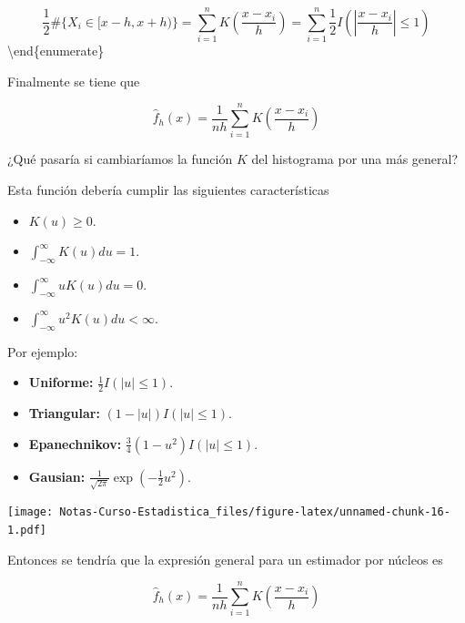 \documentclass[
  12pt,
]{book}
\providecommand{\tightlist}{%
  \setlength{\itemsep}{0pt}\setlength{\parskip}{0pt}}
\theoremstyle{definition}
\theoremstyle{definition}
\theoremstyle{definition}
\theoremstyle{remark}
\let\BeginKnitrBlock\begin \let\EndKnitrBlock\end
\begin{document}
\begin{equation*}
\frac{1}{2}\# \{ X_i \in [x-h,x+h) \}
=\sum_{i=1}^{n} K\left( \frac{x-x_{i}}{h} \right)
=\sum_{i=1}^{n}  \frac{1}{2} I \left( \left\vert \frac{x-x_{i}}{h}
\right\vert \leq 1 \right)
\end{equation*}
\textbackslash{}end\{enumerate\}

Finalmente se tiene que

\begin{equation*}
\hat{f}_{h}\left( x \right) = \frac{1}{nh}\sum_{i=1}^{n} K\left( \frac{x-x_{i}}{h} \right)
\end{equation*}

\BeginKnitrBlock{remark}
{}¿Qué pasaría si cambiaríamos la función \(K\) del histograma por una más general?
\EndKnitrBlock{remark}

Esta función debería cumplir las siguientes características

\begin{itemize}
\tightlist
\item
  \(K(u)\geq 0\).
\item
  \(\int_{-\infty}^{\infty} K(u)du = 1\).
\item
  \(\int_{-\infty}^{\infty} u K(u)du = 0\).
\item
  \(\int_{-\infty}^{\infty} u^{2} K(u)du <\infty\).
\end{itemize}

Por ejemplo:

\begin{itemize}
\tightlist
\item
  \textbf{Uniforme:} \(\frac{1}{2} I \left( \left\vert u \right\vert \leq 1 \right)\).
\item
  \textbf{Triangular:} \((1-|u|) I \left( \left\vert u \right\vert \leq 1 \right)\).
\item
  \textbf{Epanechnikov:} \(\frac{3}{4} (1-u^{2}) I \left( \left\vert u \right\vert \leq 1 \right)\).
\item
  \textbf{Gausian:} \(\frac{1}{\sqrt{2\pi}} \exp \left( -\frac{1}{2}u^{2} \right)\).
\end{itemize}

\texttt{[image: Notas-Curso-Estadistica\_files/figure-latex/unnamed-chunk-16-1.pdf]}

Entonces se tendría que la expresión general para un estimador por núcleos es

\begin{equation*}
\hat{f}_{h}\left( x \right) = \frac{1}{nh}\sum_{i=1}^{n} K\left( \frac{x-x_{i}}{h} \right)
\end{equation*}
\end{document}
